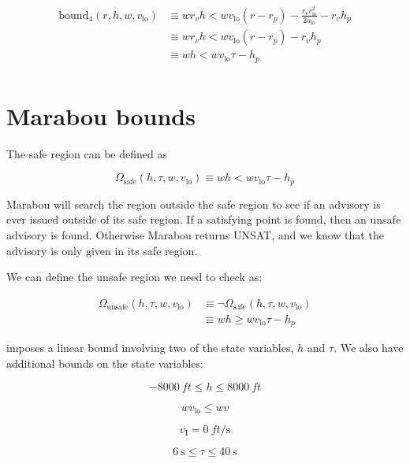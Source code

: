 \documentclass{article}
\begin{document}
\begin{align}
	\text{bound}_\text{4}(r,h,w,v_\text{lo}) &\equiv wr_vh<wv_\text{lo}(r-r_p)- \frac{r_vv_\text{lo}^2}{2a_\text{lo}} - r_vh_p \\
	 &\equiv wr_vh<wv_\text{lo}(r-r_p) - r_vh_p \\
	 &\equiv wh<wv_\text{lo}\tau - h_p \\
\end{align}

\section{Marabou bounds}
The safe region can be defined as 

\begin{equation}
\Omega_\text{safe}(h,\tau,w,v_\text{lo}) \equiv wh<wv_\text{lo}\tau-h_p
\end{equation}

Marabou will search the region outside the safe region to see if an advisory is ever issued outside of its safe region. If a satisfying point is found, then an unsafe advisory is found. Otherwise Marabou returns UNSAT, and we know that the advisory is only given in its safe region.

We can define the unsafe region we need to check as:

\begin{align} \label{eq_unsafe}
\Omega_\text{unsafe}(h,\tau,w,v_\text{lo}) &\equiv \neg \Omega_\text{safe}(h,\tau,w,v_\text{lo}) \\
&\equiv wh \ge wv_\text{lo}\tau-h_p
\end{align}
 
 imposes a linear bound involving two of the state variables, $h$ and $\tau$. We also have additional bounds on the state variables:

\begin{equation}
\SI{-8000}{ft}\le h \le \SI{8000}{ft}
\end{equation}

\begin{equation}
wv_\text{lo} \le wv
\end{equation}

\begin{equation}
v_\text{I} = \SI{0}{ft\per\second}
\end{equation}

\begin{equation}
\SI{6}{\second}\le \tau \le \SI{40}{\second}
\end{equation}
\end{document}
